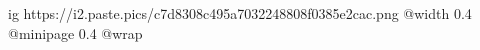  
 
 
 
 

\ifcmt
  ig https://i2.paste.pics/c7d8308c495a7032248808f0385e2cac.png
  @width 0.4
  @minipage 0.4
  @wrap \parpic[r]
\fi
